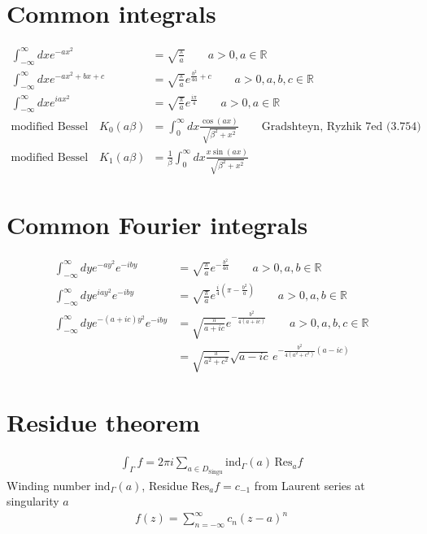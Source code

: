\documentclass[10pt,a4paper]{book}
\theoremstyle{definition}
\begin{document}
\section{Common integrals}
\begin{align}
    \int_{-\infty}^\infty dx e^{-ax^2}&=\sqrt{\frac{\pi}{a}} \qquad a>0, a\in\mathbb{R}\\
    \int_{-\infty}^\infty dx e^{-ax^2+bx+c}&=\sqrt{\frac{\pi}{a}}e^{\frac{b^2}{4a}+c} \qquad a>0, a,b,c\in\mathbb{R}\\
    \int_{-\infty}^\infty dx e^{iax^2}&=\sqrt{\frac{\pi}{a}}e^{\frac{i\pi}{4}} \qquad a>0, a\in\mathbb{R}\\
%    
\text{modified Bessel}\quad K_0(a\beta)&=\int_0^\infty dx \frac{\cos(ax)}{\sqrt{\beta^2+x^2}} \qquad \text{Gradshteyn, Ryzhik 7ed (3.754)}\\
\text{modified Bessel}\quad K_1(a\beta)&=\frac{1}{\beta}\int_0^\infty dx \frac{x\sin(ax)}{\sqrt{\beta^2+x^2}}
\end{align}



\section{Common Fourier integrals}
\begin{align}
    \int_{-\infty}^\infty dy e^{-ay^2}e^{-iby}&=\sqrt{\frac{\pi}{a}}e^{-\frac{b^2}{4a}} \qquad a>0, a,b\in\mathbb{R}\\
    \int_{-\infty}^\infty dy e^{iay^2}e^{-iby}&=\sqrt{\frac{\pi}{a}}e^{\frac{i}{4}\left(\pi-\frac{b^2}{a}\right)} \qquad a>0, a,b\in\mathbb{R}\\
    \int_{-\infty}^\infty dy e^{-(a+ic)y^2}e^{-iby}&=\sqrt{\frac{\pi}{a+ic}}e^{-\frac{b^2}{4(a+ic)}} \qquad a>0, a,b,c\in\mathbb{R}\\
    &=\sqrt{\frac{\pi}{a^2+c^2}}\sqrt{a-ic}\,e^{-\frac{b^2}{4(a^2+c^2)}(a-ic)}
\end{align}

\section{Residue theorem}
\begin{align}
\int_\Gamma f=2\pi i\sum_{a\in D_\text{Singu}}\text{ind}_\Gamma(a)\,\text{Res}_af
\end{align}
Winding number $\text{ind}_\Gamma(a)$, Residue $\text{Res}_af=c_{-1}$ from Laurent series at singularity $a$
\begin{align}
f(z)=\sum_{n=-\infty}^\infty c_n(z-a)^n
\end{align}
\end{document}
